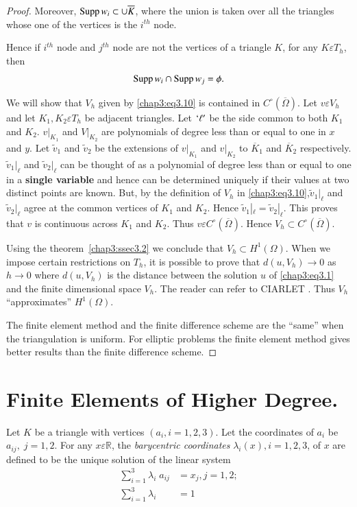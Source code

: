 \begin{proof}
Moreover, $\operatorname{Supp} w_i\subset\cup\overline{K}$, where the union is taken
over all the triangles whose one of the vertices is the $i^{th}$ node.

Hence if $i^{th}$ node and $j^{th}$ node are not the vertices of a
triangle $K$, for any $K\varepsilon T_h$, then 
$$
\operatorname{Supp} w_i\cap\operatorname{Supp} w_j=\phi.
$$

We will show that $V_h$ given by \eqref{chap3:eq3.10} is contained in
$C^\circ(\overline{\Omega})$. Let $v\varepsilon V_h$ and let $K_1, K_2
\varepsilon T_h$ be adjacent triangles. Let $`\ell'$ be the side
common to both $K_1$ and $K_2$. $v|_{K_1}$ and $V|_{K_2}$ are
polynomials of degree less than or equal to one in $x$ and $y$. Let
$\tilde{v}_1$ and $\tilde{v}_2$ be the extensions of $v|_{K_1}$ and
$v|_{K_2}$ to $\overline{K}_1$ and $\overline{K}_2$
respectively. $\tilde{v}_1|_\ell$ and $\tilde{v}_2|_\ell$ can be
thought of as a polynomial of degree less than or equal to one in a
{\bf single variable} and hence can be determined uniquely if their
values at two distinct points are known. But, by the definition of
$V_h$ in \eqref{chap3:eq3.10},\pageoriginale $\tilde{v}_1|_\ell$ and
$\tilde{v}_2|_\ell$ agree at the common vertices of $K_1$ and
$K_2$. Hence $\tilde{v}_1|_\ell=\tilde{v}_2|_\ell$. This proves that
$v$ is continuous across $K_1$ and $K_2$. Thus $v\varepsilon
C^\circ(\overline{\Omega})$. Hence $V_h\subset
C^\circ(\overline{\Omega})$.

Using the theorem~\ref{chap3:ssec3.2} we conclude that $V_h\subset
H^1(\Omega)$. When we impose certain restrictions on $T_h$, it is
possible to prove that $d(u, V_h)\to 0$ as $h\to 0$ where $d(u, V_h)$
is the distance between the solution $u$ of \eqref{chap3:eq3.1} and
the finite dimensional space $V_h$. The reader can refer to CIARLET
\cite{key9}. Thus $V_h$ ``approximates'' $H^1(\Omega)$. 

The finite element method and the finite difference scheme are the
``same'' when the triangulation is uniform. For elliptic problems the
finite element method gives better results than the finite difference
{\small scheme}.
\end{proof}

\section{Finite Elements of Higher Degree.}\label{chap3:ssec3.3}

\begin{def*}
Let $K$ be a triangle with vertices $(a_i, i=1, 2, 3)$. Let the
coordinates of $a_i$ be $a_{ij},\; j=1, 2$. For any $x\varepsilon
\mathbb{R}$, the \emph{barycentric coordinates} $\lambda_i(x), i=1, 2,
3$, of $x$ are defined to be the unique solution of the linear system 
\begin{equation}\label{chap3:eq3.13}
\begin{split}
\sum\limits_{i=1}^3 \lambda_i\;a_{ij} &= x_j, j=1, 2;\\
\sum\limits_{i=1}^3 \lambda_i &= 1
\end{split}
\end{equation}
\end{def*}

